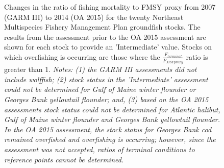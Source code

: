 \clearpage

\clearpage

\clearpage

\clearpage

\clearpage

\clearpage

\clearpage

\clearpage





\clearpage
	\begin{figure}
		\centering	
		\captionsetup{singlelinecheck=off}
		\caption[.]{Changes in the ratio of fishing mortality to FMSY proxy from 2007 (GARM III) to 2014 (OA 2015) for the twenty Northeast Multispecies Fishery Management Plan groundfish stocks. The results from the assessment prior to the OA 2015 assessment are shown for each stock to provide an 'Intermediate' value. Stocks on which overfishing is occurring are those where the $\frac{F_{terminal}}{F_{MSY{}proxy}}$ ratio is greater than 1. \textit{Notes: (1) the GARM III assessments did not include wolffish; (2) stock status in the 'Intermediate' assessment could not be determined for Gulf of Maine winter flounder or Georges Bank yellowtail flounder; and, (3) based on the OA 2015 assessments stock status could not be determined for Atlantic halibut, Gulf of Maine winter flounder and Georges Bank yellowtail flounder. In the OA 2015 assessment, the stock status for Georges Bank cod remained overfished and overfishing is occurring; however, since the assessment was not accepted, ratios of terminal conditions to reference points cannot be determined.}}		
		\label{propFmsy}
	\end{figure}
	\clearpage



